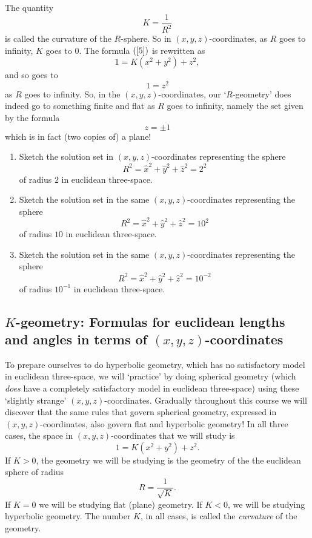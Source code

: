 \documentclass{ximera}
\begin{document}
The quantity%
\[
K=\frac{1}{R^{2}}%
\]
is called the curvature of the $R$-sphere. So in $\left(  x,y,z\right)
$-coordinates, as $R$ goes to infinity, $K$ goes to $0$. The formula $\left(
\ref{5}\right)  $ is rewritten as%
\begin{equation}
1=K\left(  x^{2}+y^{2}\right)  +z^{2}, \label{7}%
\end{equation}
and so goes to%
\[
1=z^{2}%
\]
as $R$ goes to infinity. So, in the $\left(  x,y,z\right)  $-coordinates, our
`$R$-geometry' does indeed go to something finite and flat as $R$ goes to
infinity, namely the set given by the formula%
\[
z=\pm1
\]
which is in fact (two copies of) a plane!

\begin{exercise}\hfil
\begin{enumerate}
\item Sketch the solution set in $\left(  x,y,z\right)  $-coordinates
representing the sphere%
\[
R^{2}=\hat{x}^{2}+\hat{y}^{2}+\hat{z}^{2}=2^{2}%
\]
of radius $2$ in euclidean three-space.

\item Sketch the solution set in the same $\left(  x,y,z\right)  $-coordinates
representing the sphere%
\[
R^{2}=\hat{x}^{2}+\hat{y}^{2}+\hat{z}^{2}=10^{2}%
\]
of radius $10$ in euclidean three-space.

\item Sketch the solution set in the same $\left(  x,y,z\right)  $-coordinates
representing the sphere%
\[
R^{2}=\hat{x}^{2}+\hat{y}^{2}+\hat{z}^{2}=10^{-2}%
\]
of radius $10^{-1}$ in euclidean three-space.
\end{enumerate}
\end{exercise}

\subsection*{$K$-geometry: Formulas for euclidean lengths and angles in terms
of $\left(  x,y,z\right)  $-coordinates}

To prepare ourselves to do hyperbolic geometry, which has no satisfactory
model in euclidean three-space, we will `practice' by doing spherical geometry
(which \textit{does} have a completely satisfactory model in euclidean
three-space) using these `slightly strange' $\left(  x,y,z\right)
$-coordinates. Gradually throughout this course we will discover that the same
rules that govern spherical geometry, expressed in $\left(  x,y,z\right)
$-coordinates, also govern flat and hyperbolic geometry! In all three cases,
the space in $\left(  x,y,z\right)  $-coordinates that we will study is%
\begin{equation}
1=K\left(  x^{2}+y^{2}\right)  +z^{2}. \label{11}%
\end{equation}
If $K>0$, the geometry we will be studying is the geometry of the the
euclidean sphere of radius%
\[
R=\frac{1}{\sqrt{K}}.
\]
If $K=0$ we will be studying flat (plane) geometry. If $K<0$, we will be
studying hyperbolic geometry. The number $K$, in all cases, is called the
\textit{curvature} of the geometry.
\end{document}
